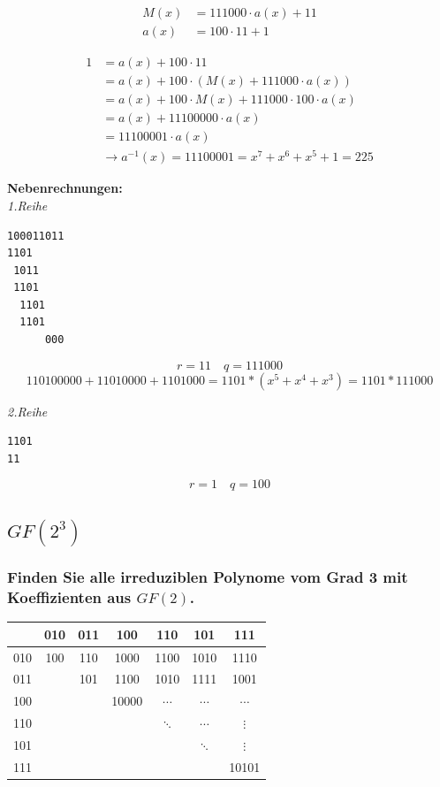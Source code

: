\begin{align*}
M(x) &= {111000} \cdot a(x) + {11} \\
a(x) &= {100} \cdot {11} + {1}
\end{align*}

\begin{align}
{1} &= a(x) + {100} \cdot {11}                                                \\
    &= a(x) + {100} \cdot (M(x) + {111000} \cdot a(x)) \\ 
    &= a(x) + {100} \cdot M(x) + {111000} \cdot {100} \cdot a(x) \\
    &= a(x) + {11100000} \cdot a(x) \\ 
    &= {11100001} \cdot a(x)   \\ 
    &\rightarrow a^{-1}(x) = {11100001} = x^7 + x^6 + x^5 + 1 = {225}
\end{align}

\noindent
\textbf{Nebenrechnungen:} \\
\noindent
\textit{1.Reihe}
\begin{verbatim}
100011011
1101     
 1011
 1101
  1101               
  1101 
      000 
\end{verbatim}
\[ r = 11 \quad q = 111000 \]
\[ 110100000 + 11010000 + 1101000 = 1101 * (x^5+x^4+x^3) = 1101 * 111000 \]

\noindent
\textit{2.Reihe}
\begin{verbatim}
1101
11
\end{verbatim}
\[ r = 1 \quad q = 100 \]

\subsection{$GF(2^3)$}
\subsubsection{Finden Sie alle irreduziblen Polynome vom Grad 3 mit Koeffizienten aus
$GF(2)$.}

\begin{center}
\begin{tabular}{c|cccccc}
& 010 & 011 & 100 & 110 & 101 & 111 \\ \hline
010 & 100 & 110 & 1000 & 1100 & 1010 & 1110 \\ 
011 &   & 101 & 1100 & 1010 & 1111 & 1001 \\ 
100 &   &   & 10000 & $\cdots$ & $\cdots$ & $\cdots$ \\ 
110 &   &   &   & $\ddots$     & $\cdots$ & $\vdots$ \\ 
101 &   &   &   &              & $\ddots$ & $\vdots$ \\ 
111 &   &   &   &              &          & 10101    \\ 
\hline 
\end{tabular} 
\end{center}

